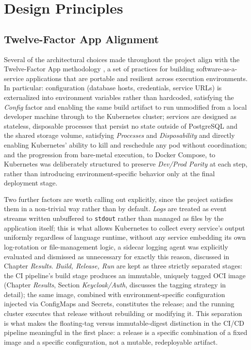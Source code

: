 \documentclass[twoside]{supsistudent}
\begin{document}
\section{Design Principles}
\subsection{Twelve-Factor App Alignment}
Several of the architectural choices made throughout the project align with the Twelve-Factor App methodology \cite{twelvefactor}, a set of practices for building software-as-a-service applications that are portable and resilient across execution environments. In particular: configuration (database hosts, credentials, service URLs) is externalized into environment variables rather than hardcoded, satisfying the \emph{Config} factor and enabling the same build artifact to run unmodified from a local developer machine through to the Kubernetes cluster; services are designed as stateless, disposable processes that persist no state outside of PostgreSQL and the shared storage volume, satisfying \emph{Processes} and \emph{Disposability} and directly enabling Kubernetes' ability to kill and reschedule any pod without coordination; and the progression from bare-metal execution, to Docker Compose, to Kubernetes was deliberately structured to preserve \emph{Dev/Prod Parity} at each step, rather than introducing environment-specific behavior only at the final deployment stage.

Two further factors are worth calling out explicitly, since the project satisfies them in a non-trivial way rather than by default. \emph{Logs} are treated as event streams written unbuffered to \texttt{stdout} rather than managed as files by the application itself; this is what allows Kubernetes to collect every service's output uniformly regardless of language runtime, without any service embedding its own log-rotation or file-management logic, a sidecar logging agent was explicitly evaluated and dismissed as unnecessary for exactly this reason, discussed in Chapter \emph{Results}. \emph{Build, Release, Run} are kept as three strictly separated stages: the CI pipeline's build stage produces an immutable, uniquely tagged OCI image (Chapter \emph{Results}, Section \emph{Keycloak/Auth}, discusses the tagging strategy in detail); the same image, combined with environment-specific configuration injected via ConfigMaps and Secrets, constitutes the release; and the running cluster executes that release without rebuilding or modifying it. This separation is what makes the floating-tag versus immutable-digest distinction in the CI/CD pipeline meaningful in the first place: a release is a specific combination of a fixed image and a specific configuration, not a mutable, redeployable artifact.
\end{document}

